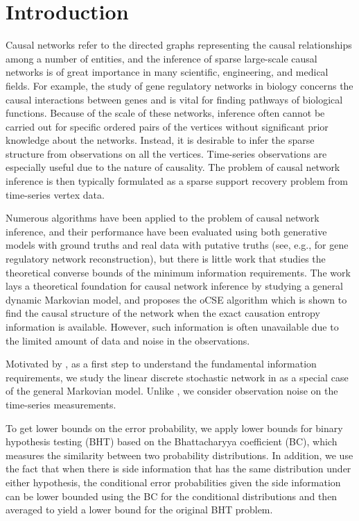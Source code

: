 \documentclass[conference,letterpaper]{IEEEtran}
\begin{document}
\section{Introduction}
Causal networks refer to the directed graphs representing the causal
relationships among a number of entities, and the inference of sparse
large-scale causal networks is of great importance in many scientific,
engineering, and medical fields.  For example, the study of gene
regulatory networks in biology concerns the causal interactions
between genes and is vital for finding pathways of biological
functions.  Because of the scale of these networks, inference often
cannot be carried out for specific ordered pairs of the vertices
without significant prior knowledge about the networks.  Instead, it
is desirable to infer the sparse structure from observations on all
the vertices.  Time-series observations are especially useful due to
the nature of causality.  The problem of causal network inference is
then typically formulated as a sparse support recovery problem from
time-series vertex data.

Numerous algorithms have been applied to the problem of causal network
inference, and their performance have been evaluated using both
generative models with ground truths and real data with putative
truths (see, e.g., \cite{MarbachCostelloKuffner12} for gene regulatory
network reconstruction), but there is little work that studies the
theoretical converse bounds of the minimum information requirements.
The work \cite{SunTaylorBollt15} lays a
theoretical foundation for causal network inference by studying a
general dynamic Markovian model, and proposes the oCSE algorithm which
is shown to find the causal structure of the network when the exact
causation entropy information is available.  However, such information
is often unavailable due to the limited amount of data and noise in
the observations.

Motivated by \cite{SunTaylorBollt15}, as a first step to understand
the fundamental information requirements, we study the linear discrete
stochastic network in \cite{SunTaylorBollt15} as a special case of the
general Markovian model.  Unlike \cite{SunTaylorBollt15}, we consider
observation noise on the time-series measurements.

To get lower bounds on the error probability, we apply lower bounds
for binary hypothesis testing (BHT) based on the Bhattacharyya
coefficient (BC), which measures the similarity between two
probability distributions.  In addition, we use the fact that when
there is side information that has the same distribution under either
hypothesis, the conditional error probabilities given the side
information can be lower bounded using the BC for the conditional
distributions and then averaged to yield a lower bound for the
original BHT problem.
\end{document}
